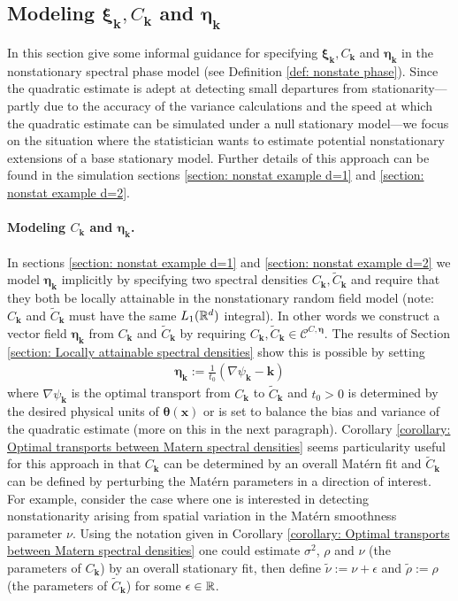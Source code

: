 \documentclass[10pt,noinfoline]{imsart}
\newcommand{\bs}{\boldsymbol}
\begin{document}
\subsection{Modeling $\bs \xi_{\bs k}, C_{\bs k}$ and $\bs\eta_{\bs k}$}
\label{section: modeling xi, C and eta}

In this section give some informal guidance for specifying $\bs \xi_{\bs k}, C_{\bs k}$ and $\bs\eta_{\bs k}$ in the nonstationary spectral phase model (see Definition \ref{def: nonstate phase}). Since the quadratic estimate is  adept at detecting small departures from stationarity---partly due to the accuracy of the variance calculations and the speed at which the quadratic estimate can be simulated under a null stationary model---we focus on the situation where the statistician wants to estimate potential nonstationary extensions of a base stationary model. Further details of this approach can be found in the simulation sections \ref{section: nonstat example d=1} and \ref{section: nonstat example d=2}. 


\paragraph{Modeling $C_{\bs k}$ and $\bs\eta_{\bs k}$.} In sections \ref{section: nonstat example d=1} and \ref{section: nonstat example d=2}  we model $\bs\eta_{\bs k}$ implicitly by specifying two spectral densities $C_{\bs k}, \tilde C_{\bs k}$ and require that they both be locally attainable in the nonstationary random field model (note: $C_{\bs k}$ and $\tilde C_{\bs k}$ must have the same $L_1(\Bbb R^d)$ integral). In other words we construct a vector field $\bs \eta_{\bs k}$ from $C_{\bs k}$ and $\tilde C_{\bs k}$ by requiring  $C_{\bs k},\tilde C_{\bs k}\in \mathscr C^{C,\bs \eta}$. The results of Section \ref{section: Locally attainable spectral densities} show this is possible by setting 
\begin{align}
\label{eq: modeling eta}
\bs \eta_{\bs k}:=  \frac{1}{t_0}(\nabla \psi_{\bs k}-\bs k)
\end{align}
 where  $\nabla \psi_{\bs k}$ is the optimal transport from $C_{\bs k}$ to $\tilde C_{\bs k}$ and $t_0>0$ is determined  by the  desired physical units of $\bs \theta(\bs x)$ or is set to balance the bias and variance of the quadratic estimate (more on this in the next paragraph). Corollary \ref{corollary: Optimal transports between Matern spectral densities} seems particularity useful for this approach in that $C_{\bs k}$ can be determined by an overall Mat\'ern fit and $\tilde C_{\bs k}$ can be defined by perturbing the Mat\'ern  parameters in a direction of interest. For example, consider the case where one is interested in detecting nonstationarity arising from spatial variation in the Mat\'ern smoothness parameter $\nu$.  Using the notation given in Corollary \ref{corollary: Optimal transports between Matern spectral densities} one could estimate $\sigma^2$, $\rho$ and  $\nu$ (the parameters of $C_{\bs k}$) by an overall stationary fit, then define  $\tilde\nu := \nu + \epsilon$ and $\tilde \rho := \rho$ (the parameters of $\tilde C_{\bs k}$) for some $\epsilon\in\Bbb R$.  
\end{document}
